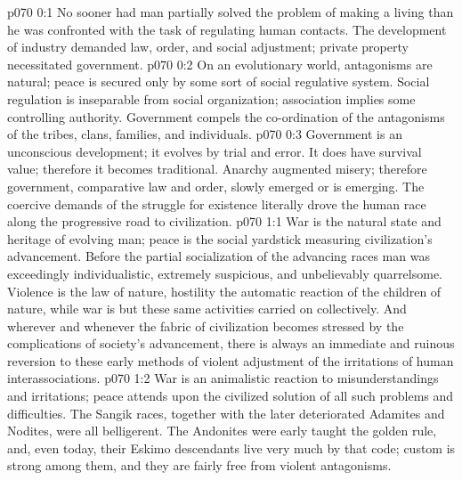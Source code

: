 \author{Melchizedek}
\vs p070 0:1 No sooner had man partially solved the problem of making a living than he was confronted with the task of regulating human contacts. The development of industry demanded law, order, and social adjustment; private property necessitated government.
\vs p070 0:2 On an evolutionary world, antagonisms are natural; peace is secured only by some sort of social regulative system. Social regulation is inseparable from social organization; association implies some controlling authority. Government compels the co\hyp{}ordination of the antagonisms of the tribes, clans, families, and individuals.
\vs p070 0:3 Government is an unconscious development; it evolves by trial and error. It does have survival value; therefore it becomes traditional. Anarchy augmented misery; therefore government, comparative law and order, slowly emerged or is emerging. The coercive demands of the struggle for existence literally drove the human race along the progressive road to civilization.
\vs p070 1:1 War is the natural state and heritage of evolving man; peace is the social yardstick measuring civilization’s advancement. Before the partial socialization of the advancing races man was exceedingly individualistic, extremely suspicious, and unbelievably quarrelsome. Violence is the law of nature, hostility the automatic reaction of the children of nature, while war is but these same activities carried on collectively. And wherever and whenever the fabric of civilization becomes stressed by the complications of society’s advancement, there is always an immediate and ruinous reversion to these early methods of violent adjustment of the irritations of human interassociations.
\vs p070 1:2 War is an animalistic reaction to misunderstandings and irritations; peace attends upon the civilized solution of all such problems and difficulties. The Sangik races, together with the later deteriorated Adamites and Nodites, were all belligerent. The Andonites were early taught the golden rule, and, even today, their Eskimo descendants live very much by that code; custom is strong among them, and they are fairly free from violent antagonisms.
